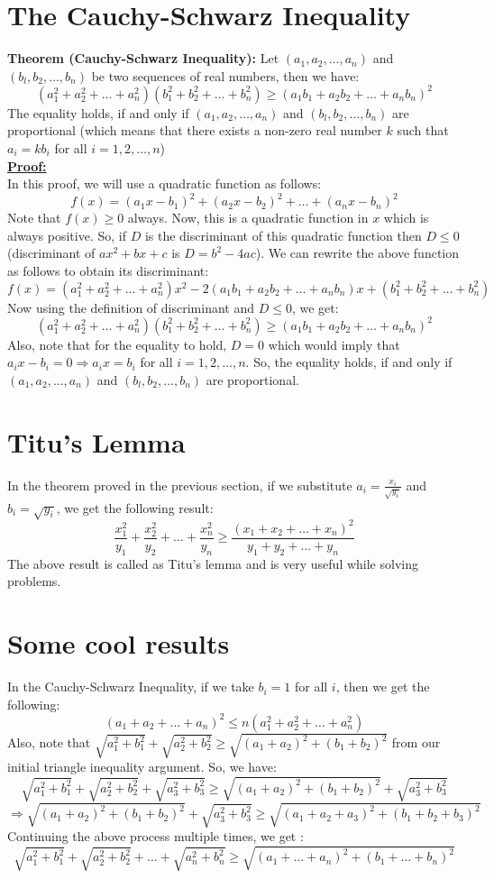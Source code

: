 \documentclass[12pt]{article}
\begin{document}
\section{The Cauchy-Schwarz Inequality}
\textbf{Theorem (Cauchy-Schwarz Inequality): }Let $(a_1, a_2,\dots , a_n)$ and $(b_l , b_2,\dots ,b_n)$ be
two sequences of real numbers, then we have:
$$ (a_1^2+a_2^2+\dots+a_n^2)(b_1^2+b_2^2+\dots+b_n^2)\geq (a_1b_1+a_2b_2+\dots+a_nb_n)^2$$
The equality holds, if and only if $(a_1, a_2,\dots , a_n)$ and $(b_l , b_2,\dots ,b_n)$ are proportional (which means that there exists a non-zero real number $k$ such that $a_i=kb_i$ for all $i=1,2,\dots,n$)\\
\underline{\textbf{Proof:}}\\
In this proof, we will use a quadratic function as follows:
$$ f(x)=(a_1x-b_1)^2+(a_2x-b_2)^2+\dots +(a_nx-b_n)^2$$
Note that $f(x)\geq0 $ always. Now, this is a quadratic function in $x$ which is always positive. So, if $D$ is the discriminant of this quadratic function then $D\leq 0$ (discriminant of $ax^2+bx+c$ is $D=b^2-4ac$). We can rewrite the above function as follows to obtain its discriminant:
$$f(x)=(a_1^2+a_2^2+\dots+a_n^2)x^2-2(a_1b_1+a_2b_2+\dots+a_nb_n)x+(b_1^2+b_2^2+\dots+b_n^2)$$
Now using the definition of discriminant and $D\leq0$, we get:
$$(a_1^2+a_2^2+\dots+a_n^2)(b_1^2+b_2^2+\dots+b_n^2)\geq (a_1b_1+a_2b_2+\dots+a_nb_n)^2$$
Also, note that for the equality to hold, $D=0$ which would imply that $a_ix-b_i=0\Rightarrow a_ix=b_i$ for all $i=1,2,\dots ,n$. So, the equality holds, if and only if $(a_1, a_2,\dots , a_n)$ and $(b_l , b_2,\dots ,b_n)$ are proportional.\\
\newpage
\section{Titu's Lemma}
In the theorem proved in the previous section, if we substitute $ \displaystyle a_i=\frac{x_i}{\sqrt{y_i}}$ and $ \displaystyle b_i=\sqrt{y_i}$, we get the following result:
$$\displaystyle\frac{x_1^2}{y_1}+\frac{x_2^2}{y_2}+\ldots+\frac{x_n^2}{y_n} \geq \frac{\left(x_1+x_2+\ldots+x_n\right)^2}{y_1+y_2+\ldots+y_n}$$
The above result is called as Titu's lemma and is very useful while solving problems.
\section{Some cool results}
In the Cauchy-Schwarz Inequality, if we take $b_i=1$ for all $i$, then we get the following:
$$\left(a_1+a_2+\ldots+a_n\right)^2 \leq n\left(a_1^2+a_2^2+\ldots+a_n^2\right)$$
Also, note that $\sqrt{a_1^2+b_1^2}+\sqrt{a_2^2+b_2^2} \geq \sqrt{\left(a_1+a_2\right)^2+\left(b_1+b_2\right)^2}$ from our initial triangle inequality argument. So, we have:
$$ \sqrt{a_1^2+b_1^2}+\sqrt{a_2^2+b_2^2}+\sqrt{a_3^2+b_3^2} \geq \sqrt{\left(a_1+a_2\right)^2+\left(b_1+b_2\right)^2}+\sqrt{a_3^2+b_3^2}$$ $$ \Rightarrow\sqrt{\left(a_1+a_2\right)^2+\left(b_1+b_2\right)^2}+\sqrt{a_3^2+b_3^2}\geq\sqrt{\left(a_1+a_2+a_3\right)^2+\left(b_1+b_2+b_3\right)^2}$$
Continuing the above process multiple times, we get :
$$\sqrt{a_1^2+b_1^2}+\sqrt{a_2^2+b_2^2}+\ldots+\sqrt{a_n^2+b_n^2} \geq \sqrt{\left(a_1+\ldots+a_n\right)^2+\left(b_1+\ldots+b_n\right)^2}$$
\end{document}
